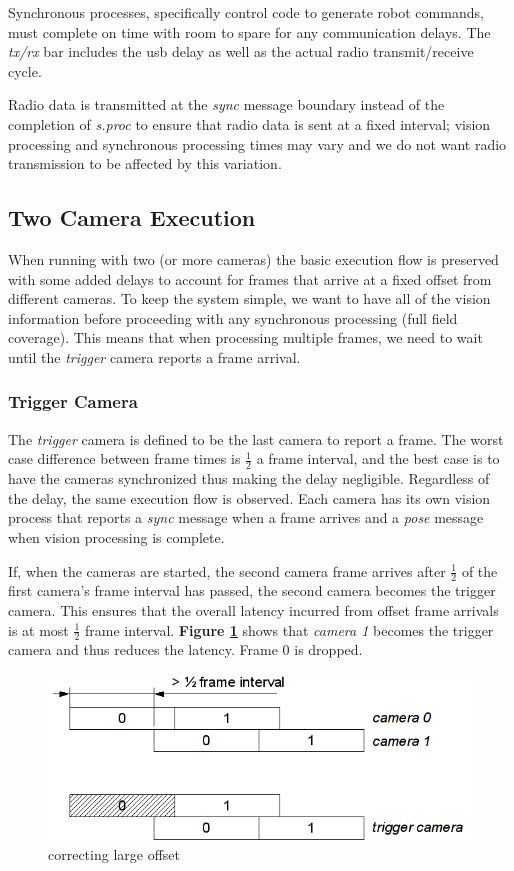 \documentclass[letterpaper]{llncs}
\begin{document}
Synchronous processes, specifically control code to generate robot commands, must complete on time with room to spare for any communication delays. The \textit{tx/rx} bar includes the usb delay as well as the actual radio transmit/receive cycle. 

Radio data is transmitted at the \textit{sync} message boundary instead of the completion of \textit{s.proc} to ensure that radio data is sent at a fixed interval; vision processing and synchronous processing times may vary and we do not want radio transmission to be affected by this variation.

\subsection{Two Camera Execution}
When running with two (or more cameras) the basic execution flow is preserved with some added delays to account for frames that arrive at a fixed offset from different cameras. To keep the system simple, we want to have all of the vision information before proceeding with any synchronous processing (full field coverage). This means that when processing multiple frames, we need to wait until the \textit{trigger} camera reports a frame arrival.

\subsubsection{Trigger Camera}
The \textit{trigger} camera is defined to be the last camera to report a frame. The worst case difference between frame times is $\frac{1}{2}$ a frame interval, and the best case is to have the cameras synchronized thus making the delay negligible. Regardless of the delay, the same execution flow is observed. Each camera has its own vision process that reports a \textit{sync} message when a frame arrives and a \textit{pose} message when vision processing is complete.

If, when the cameras are started, the second camera frame arrives after $\frac{1}{2}$ of the first camera's frame interval has passed, the second camera becomes the trigger camera. This ensures that the overall latency incurred from offset frame arrivals is at most $\frac{1}{2}$ frame interval. \textbf{Figure \ref{largeoffset}} shows that \textit{camera 1} becomes the trigger camera and thus reduces the latency. Frame 0 is dropped.

\begin{figure}[h]
	\centering
	\includegraphics[width=.75\textwidth]{images/largeoffset.png}
	\caption{correcting large offset}
	\label{largeoffset}
\end{figure}
\end{document}
